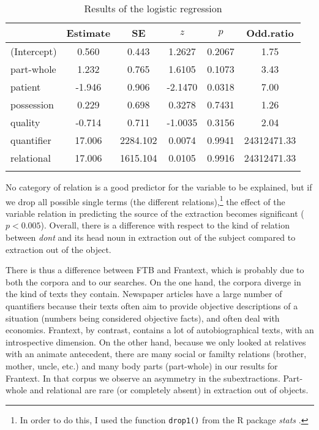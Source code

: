 \begin{table}
\begin{tabular}{l S[table-format=-2.3] S[table-format=4.3] S[table-format=-1.4] S[table-format=1.4] S[table-format=8.2]}
  \lsptoprule
         & {Estimate} & {SE} & {$z$} & {$p$} & {Odd.ratio} \\ 
  \midrule
(Intercept) & 0.560 & 0.443 & 1.2627 & 0.2067 & 1.75 \\ 
   part-whole & 1.232 & 0.765 & 1.6105 & 0.1073 & 3.43 \\ 
   patient & -1.946 & 0.906 & -2.1470 & 0.0318 & 7.00 \\ 
   possession & 0.229 & 0.698 & 0.3278 & 0.7431 & 1.26 \\ 
   quality & -0.714 & 0.711 & -1.0035 & 0.3156 & 2.04 \\ 
   quantifier & 17.006 & 2284.102 & 0.0074 & 0.9941 & 24312471.33 \\ 
   relational & 17.006 & 1615.104 & 0.0105 & 0.9916 & 24312471.33 \\ 
   \lspbottomrule
\end{tabular}
\caption{Results of the logistic regression}
        \label{tab:d2000-relations}
\end{table}

No category of relation is a good predictor for the variable to be explained, but if we drop all possible single terms (the different relations),\footnote{In order to do this, I used the function \texttt{drop1()} from the R package \emph{stats} \citep{R}.} the effect of the variable relation in predicting the source of the extraction becomes significant ($p<0.005$). Overall, there is a difference with respect to the kind of relation between \emph{dont} and its head noun in extraction out of the subject compared to extraction out of the object.

There is thus a difference between FTB and Frantext, which is probably due to both the corpora and to our searches. On the one hand, the corpora diverge in the kind of texts they contain. Newspaper articles have a large number of quantifiers because their texts often aim to provide objective descriptions of a situation (numbers being considered objective facts), and often deal with economics. Frantext, by contrast, contains a lot of autobiographical texts, with an introspective dimension. On the other hand, because we only looked at relatives with an animate antecedent, there are many social or familty relations (brother, mother, uncle, etc.) and many body parts (part-whole) in our results for Frantext. In that corpus we observe an asymmetry in the subextractions. Part-whole and relational are rare (or completely absent) in extraction out of objects.

